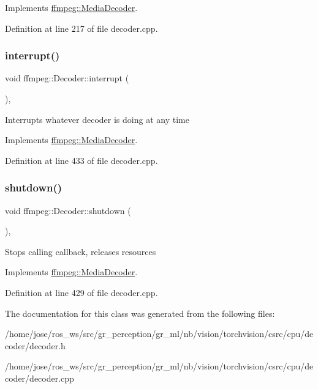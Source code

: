Implements \hyperlink{classffmpeg_1_1MediaDecoder_a1e65150d20d7540f8e35ce2d9f13017f}{ffmpeg\+::\+Media\+Decoder}.



Definition at line 217 of file decoder.\+cpp.

\mbox{\label{classffmpeg_1_1Decoder_a4f0672cd7855e99dbdd7ceceb634d51b}} 
\subsubsection{\texorpdfstring{interrupt()}{interrupt()}}
{\footnotesize\ttfamily void ffmpeg\+::\+Decoder\+::interrupt (\begin{DoxyParamCaption}{ }\end{DoxyParamCaption})\hspace{0.3cm}{\ttfamily [override]}, {\ttfamily [virtual]}}

Interrupts whatever decoder is doing at any time 

Implements \hyperlink{classffmpeg_1_1MediaDecoder_a165ba6847844ec6057ffcb6b7379f2af}{ffmpeg\+::\+Media\+Decoder}.



Definition at line 433 of file decoder.\+cpp.

\mbox{\label{classffmpeg_1_1Decoder_a1838e1a5548671a7b19426bff8ff9b3c}} 
\subsubsection{\texorpdfstring{shutdown()}{shutdown()}}
{\footnotesize\ttfamily void ffmpeg\+::\+Decoder\+::shutdown (\begin{DoxyParamCaption}{ }\end{DoxyParamCaption})\hspace{0.3cm}{\ttfamily [override]}, {\ttfamily [virtual]}}

Stops calling callback, releases resources 

Implements \hyperlink{classffmpeg_1_1MediaDecoder_a844a205a22a365e6c8945e0a54ca7b66}{ffmpeg\+::\+Media\+Decoder}.



Definition at line 429 of file decoder.\+cpp.



The documentation for this class was generated from the following files\+:\begin{DoxyCompactItemize}
\item 
/home/jose/ros\+\_\+ws/src/gr\+\_\+perception/gr\+\_\+ml/nb/vision/torchvision/csrc/cpu/decoder/decoder.\+h\item 
/home/jose/ros\+\_\+ws/src/gr\+\_\+perception/gr\+\_\+ml/nb/vision/torchvision/csrc/cpu/decoder/decoder.\+cpp\end{DoxyCompactItemize}
